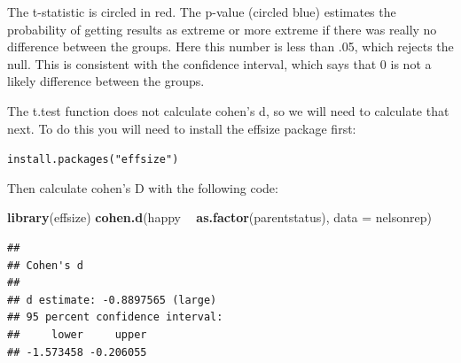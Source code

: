 \documentclass[
]{book}
\newenvironment{Shaded}{\begin{snugshade}}{\end{snugshade}}
\newcommand{\DataTypeTok}[1]{\textcolor[rgb]{0.13,0.29,0.53}{#1}}
\newcommand{\KeywordTok}[1]{\textcolor[rgb]{0.13,0.29,0.53}{\textbf{#1}}}
\newcommand{\NormalTok}[1]{#1}
\newcommand{\OperatorTok}[1]{\textcolor[rgb]{0.81,0.36,0.00}{\textbf{#1}}}
\newcommand{\StringTok}[1]{\textcolor[rgb]{0.31,0.60,0.02}{#1}}
\begin{document}
The t-statistic is circled in red. The p-value (circled blue) estimates the probability of getting results as extreme or more extreme if there was really no difference between the groups. Here this number is less than .05, which rejects the null. This is consistent with the confidence interval, which says that 0 is not a likely difference between the groups.

The t.test function does not calculate cohen's d, so we will need to calculate that next. To do this you will need to install the effsize package first:

\texttt{install.packages("effsize")}

Then calculate cohen's D with the following code:

\begin{Shaded}
\begin{Highlighting}[]
\KeywordTok{library}\NormalTok{(effsize)}
\KeywordTok{cohen.d}\NormalTok{(happy }\OperatorTok{~}\StringTok{ }\KeywordTok{as.factor}\NormalTok{(parentstatus), }\DataTypeTok{data =}\NormalTok{ nelsonrep)}
\end{Highlighting}
\end{Shaded}

\begin{verbatim}
## 
## Cohen's d
## 
## d estimate: -0.8897565 (large)
## 95 percent confidence interval:
##     lower     upper 
## -1.573458 -0.206055
\end{verbatim}
\end{document}
